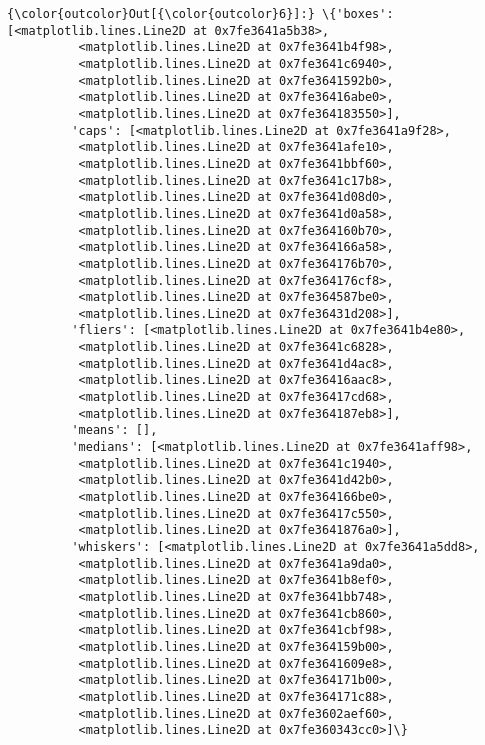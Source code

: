 \documentclass[11pt]{article}
\begin{document}
\begin{Verbatim}[commandchars=\\\{\}]
{\color{outcolor}Out[{\color{outcolor}6}]:} \{'boxes': [<matplotlib.lines.Line2D at 0x7fe3641a5b38>,
          <matplotlib.lines.Line2D at 0x7fe3641b4f98>,
          <matplotlib.lines.Line2D at 0x7fe3641c6940>,
          <matplotlib.lines.Line2D at 0x7fe3641592b0>,
          <matplotlib.lines.Line2D at 0x7fe36416abe0>,
          <matplotlib.lines.Line2D at 0x7fe364183550>],
         'caps': [<matplotlib.lines.Line2D at 0x7fe3641a9f28>,
          <matplotlib.lines.Line2D at 0x7fe3641afe10>,
          <matplotlib.lines.Line2D at 0x7fe3641bbf60>,
          <matplotlib.lines.Line2D at 0x7fe3641c17b8>,
          <matplotlib.lines.Line2D at 0x7fe3641d08d0>,
          <matplotlib.lines.Line2D at 0x7fe3641d0a58>,
          <matplotlib.lines.Line2D at 0x7fe364160b70>,
          <matplotlib.lines.Line2D at 0x7fe364166a58>,
          <matplotlib.lines.Line2D at 0x7fe364176b70>,
          <matplotlib.lines.Line2D at 0x7fe364176cf8>,
          <matplotlib.lines.Line2D at 0x7fe364587be0>,
          <matplotlib.lines.Line2D at 0x7fe36431d208>],
         'fliers': [<matplotlib.lines.Line2D at 0x7fe3641b4e80>,
          <matplotlib.lines.Line2D at 0x7fe3641c6828>,
          <matplotlib.lines.Line2D at 0x7fe3641d4ac8>,
          <matplotlib.lines.Line2D at 0x7fe36416aac8>,
          <matplotlib.lines.Line2D at 0x7fe36417cd68>,
          <matplotlib.lines.Line2D at 0x7fe364187eb8>],
         'means': [],
         'medians': [<matplotlib.lines.Line2D at 0x7fe3641aff98>,
          <matplotlib.lines.Line2D at 0x7fe3641c1940>,
          <matplotlib.lines.Line2D at 0x7fe3641d42b0>,
          <matplotlib.lines.Line2D at 0x7fe364166be0>,
          <matplotlib.lines.Line2D at 0x7fe36417c550>,
          <matplotlib.lines.Line2D at 0x7fe3641876a0>],
         'whiskers': [<matplotlib.lines.Line2D at 0x7fe3641a5dd8>,
          <matplotlib.lines.Line2D at 0x7fe3641a9da0>,
          <matplotlib.lines.Line2D at 0x7fe3641b8ef0>,
          <matplotlib.lines.Line2D at 0x7fe3641bb748>,
          <matplotlib.lines.Line2D at 0x7fe3641cb860>,
          <matplotlib.lines.Line2D at 0x7fe3641cbf98>,
          <matplotlib.lines.Line2D at 0x7fe364159b00>,
          <matplotlib.lines.Line2D at 0x7fe3641609e8>,
          <matplotlib.lines.Line2D at 0x7fe364171b00>,
          <matplotlib.lines.Line2D at 0x7fe364171c88>,
          <matplotlib.lines.Line2D at 0x7fe3602aef60>,
          <matplotlib.lines.Line2D at 0x7fe360343cc0>]\}
\end{Verbatim}
            
\end{document}
